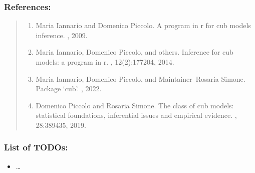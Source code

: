 \documentclass[letterpaper,10pt,english]{sphinxmanual}
\begin{document}
\subsubsection{References:}
\label{\detokenize{cubmods:id678}}\begin{quote}
\begin{enumerate}
%
\setcounter{enumi}{0}
\item {} 
\sphinxAtStartPar
Maria Iannario and Domenico Piccolo. A program in r for cub models inference. , 2009.

\item {} 
\sphinxAtStartPar
Maria Iannario, Domenico Piccolo, and others. Inference for cub models: a program in r. , 12(2):177\textendash{}204, 2014.

\item {} 
\sphinxAtStartPar
Maria Iannario, Domenico Piccolo, and Maintainer Rosaria Simone. Package ‘cub’. , 2022.

\item {} 
\sphinxAtStartPar
Domenico Piccolo and Rosaria Simone. The class of cub models: statistical foundations, inferential issues and empirical evidence. , 28:389\textendash{}435, 2019.

\end{enumerate}
\end{quote}


\subsubsection{List of TODOs:}
\label{\detokenize{cubmods:id716}}\begin{itemize}
\item {} 
\sphinxAtStartPar
…

\end{itemize}
\end{document}

